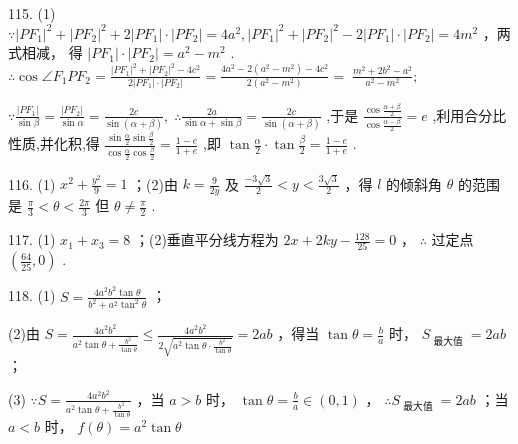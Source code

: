 \documentclass[10pt]{article}
\begin{document}
115. (1) \(\because {\left| P{F}_{1}\right| }^{2} + {\left| P{F}_{2}\right| }^{2} + 2\left| {P{F}_{1}}\right|  \cdot  \left| {P{F}_{2}}\right|  = 4{a}^{2},{\left| P{F}_{1}\right| }^{2} + {\left| P{F}_{2}\right| }^{2} - 2\left| {P{F}_{1}}\right|  \cdot  \left| {P{F}_{2}}\right|  = 4{m}^{2}\) ，两式相减， 得 \(\left| {P{F}_{1}}\right|  \cdot  \left| {P{F}_{2}}\right|  = {a}^{2} - {m}^{2}\) . \(\therefore \cos \angle {F}_{1}P{F}_{2} = \frac{{\left| P{F}_{1}\right| }^{2} + {\left| P{F}_{2}\right| }^{2} - 4{c}^{2}}{2\left| {P{F}_{1}}\right|  \cdot  \left| {P{F}_{2}}\right| } = \frac{4{a}^{2} - 2\left( {{a}^{2} - {m}^{2}}\right)  - 4{c}^{2}}{2\left( {{a}^{2} - {m}^{2}}\right) } = \; \frac{{m}^{2} + 2{b}^{2} - {a}^{2}}{{a}^{2} - {m}^{2}};\)

\(\because \frac{\left| P{F}_{1}\right| }{\sin \beta } = \frac{\left| P{F}_{2}\right| }{\sin \alpha } = \frac{2c}{\sin \left( {\alpha  + \beta }\right) },\;\therefore \frac{2a}{\sin \alpha  + \sin \beta } = \frac{2c}{\sin \left( {\alpha  + \beta }\right) }\) ,于是 \(\frac{\cos \frac{\alpha  + \beta }{2}}{\cos \frac{\alpha  - \beta }{2}} = e\) ,利用合分比性质,并化积,得 \(\frac{\sin \frac{\alpha }{2}\sin \frac{\beta }{2}}{\cos \frac{\alpha }{2}\cos \frac{\beta }{2}} = \frac{1 - e}{1 + e}\) ,即 \(\tan \frac{\alpha }{2} \cdot  \tan \frac{\beta }{2} = \frac{1 - e}{1 + e}\) .

116. (1) \({x}^{2} + \frac{{y}^{2}}{9} = 1\) ；(2)由 \(k = \frac{9}{2y}\) 及 \(\frac{-3\sqrt{3}}{2} < y < \frac{3\sqrt{3}}{2}\) ，得 \(l\) 的倾斜角 \(\theta\) 的范围是 \(\frac{\pi }{3} < \theta  < \frac{2\pi }{3}\) 但 \(\theta  \neq  \frac{\pi }{2}\) .

117. (1) \({x}_{1} + {x}_{3} = 8\) ；(2)垂直平分线方程为 \({2x} + {2ky} - \frac{128}{25} = 0\) ， \(\therefore\) 过定点 \(\left( {\frac{64}{25},0}\right)\) .

118. (1) \(S = \frac{4{a}^{2}{b}^{2}\tan \theta }{{b}^{2} + {a}^{2}{\tan }^{2}\theta }\) ；

(2)由 \(S = \frac{4{a}^{2}{b}^{2}}{{a}^{2}\tan \theta  + \frac{{b}^{2}}{\tan \theta }} \leq  \frac{4{a}^{2}{b}^{2}}{2\sqrt{{a}^{2}\tan \theta  \cdot  \frac{{b}^{2}}{\tan \theta }}} = {2ab}\) ，得当 \(\tan \theta  = \frac{b}{a}\) 时， \({S}_{\text{ 最大值 }} = {2ab}\) ；

(3) \(\because S = \frac{4{a}^{2}{b}^{2}}{{a}^{2}\tan \theta  + \frac{{b}^{2}}{\tan \theta }}\) ，当 \(a > b\) 时， \(\tan \theta  = \frac{b}{a} \in  \left( {0,1}\right)\) ， \(\therefore {S}_{\text{ 最大值 }} = {2ab}\) ；当 \(a < b\) 时， \(f\left( \theta \right)  = {a}^{2}\tan \theta\)
\end{document}
